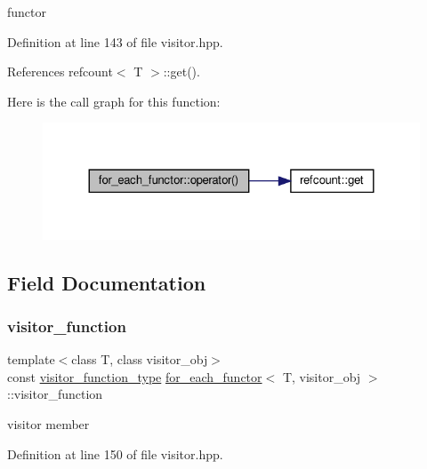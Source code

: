 functor 



Definition at line 143 of file visitor.\+hpp.



References refcount$<$ T $>$\+::get().

Here is the call graph for this function\+:
\nopagebreak
\begin{figure}[H]
\begin{center}
\leavevmode
\includegraphics[width=324pt]{d7/d01/classfor__each__functor_a6e3884dc44022d03e574ceedf93fc266_cgraph}
\end{center}
\end{figure}


\subsection{Field Documentation}
\mbox{\label{classfor__each__functor_aab63d088709b7e2f5ce147322272c54a}} 
\subsubsection{\texorpdfstring{visitor\+\_\+function}{visitor\_function}}
{\footnotesize\ttfamily template$<$class T, class visitor\+\_\+obj$>$ \\
const \hyperlink{classfor__each__functor_a959ddc30176d0364c4ceb00d09ae996b}{visitor\+\_\+function\+\_\+type} \hyperlink{classfor__each__functor}{for\+\_\+each\+\_\+functor}$<$ T, visitor\+\_\+obj $>$\+::visitor\+\_\+function\hspace{0.3cm}{\ttfamily [private]}}



visitor member 



Definition at line 150 of file visitor.\+hpp.

\mbox{\label{classfor__each__functor_a1dc5e71df160917fa6317006ed4d62dd}} 
